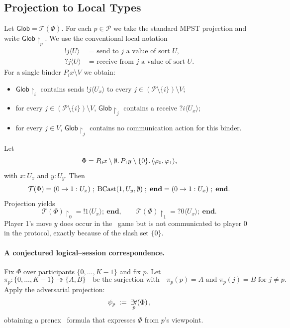 \subsection{Projection to Local Types}

Let $\mathsf{Glob} = \mathcal{T}(\Phi)$. For each $p \in \mathcal{P}$ we take the standard MPST projection and write $\mathsf{Glob} \upharpoonright_p$. We use the conventional local notation
\[
\begin{aligned}
  !j\langle U\rangle &\text{ = send to $j$ a value of sort $U$}, \\
  ?j\langle U\rangle &\text{ = receive from $j$ a value of sort $U$}.
\end{aligned}
\]
For a single binder $P_i x \setminus V$ we obtain:

\begin{itemize}
  \item $\mathsf{Glob} \upharpoonright_i$ contains sends $!j\langle U_x\rangle$ to every $j \in (\mathcal{P} \setminus \{i\}) \setminus V$;
  \item for every $j \in (\mathcal{P} \setminus \{i\}) \setminus V$, $\mathsf{Glob} \upharpoonright_j$ contains a receive $?i\langle U_x\rangle$;
  \item for every $j \in V$, $\mathsf{Glob} \upharpoonright_j$ contains no communication action for this binder.
\end{itemize}

\begin{example}
Let
\[
  \Phi = P_0 x \setminus \emptyset.\, P_1 y \setminus \{0\}.\, \langle \varphi_0,\varphi_1\rangle,
\]
with $x : U_x$ and $y : U_y$. Then
\[
  \mathcal{T}(\Phi)
  = (0 \to 1 : U_x) \;;\; \mathrm{BCast}(1,U_y,\emptyset) \;;\; \mathbf{end}
  = (0 \to 1 : U_x) \;;\; \mathbf{end}.
\]
Projection yields
\[
  \mathcal{T}(\Phi) \upharpoonright_0 = !1\langle U_x\rangle;\ \mathbf{end},
  \qquad
  \mathcal{T}(\Phi) \upharpoonright_1 = ?0\langle U_x\rangle;\ \mathbf{end}.
\]
Player 1's move $y$ does occur in the \KFOL\ game but is not communicated to player 0 in the protocol, exactly because of the slash set $\{0\}$.
\end{example}

\paragraph{A conjectured logical--session correspondence.}
Fix $\Phi$ over participants $\{0,\dots,K-1\}$ and fix $p$. Let
\[
  \pi_p : \{0,\dots,K-1\} \twoheadrightarrow \{A,B\}
  \quad\text{be the surjection with}\quad
  \pi_p(p) = A \text{ and } \pi_p(j) = B \text{ for } j \neq p.
\]
Apply the adversarial projection:
\[
  \psi_p \;:=\; \mathop{\exists\!\forall}_{p}\!\left(\Phi\right),
\]
obtaining a prenex \FOL\ formula that expresses $\Phi$ from $p$'s
viewpoint.


